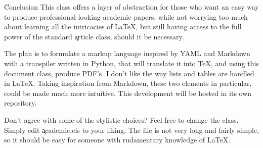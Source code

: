 \documentclass[onecolumn]{tome}
\begin{document}
\H{Conclusion}
This class offers a layer of abstraction for those who want an easy way to produce professional-looking academic papers, while not worrying too much about learning all the intricacies of LaTeX, but still having access to the full power of the standard \c{article} class, should it be necessary.

The plan is to formulate a markup language inspired by YAML and Markdown with a transpiler written in Python, that will translate it into TeX, and using this document class, produce PDF's. I don't like the way lists and tables are handled in LaTeX. Taking inspiration from Markdown, these two elements in particular, could be made much more intuitive. This development will be hosted in its own repository.

Don't agree with some of the stylistic choices? Feel free to change the class. Simply edit \c{academic.cls} to your liking. The file is not very long and fairly simple, so it should be easy for someone with rudamentary knowledge of LaTeX.
\end{document}
